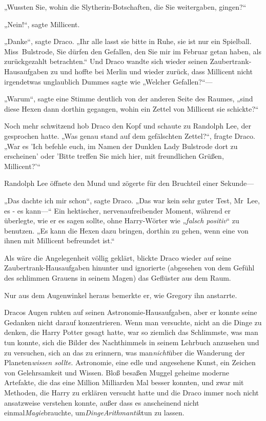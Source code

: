 {„Wussten Sie, wohin die Slytherin-Botschaften, die Sie weitergaben, gingen?“

„Nein!“, sagte Millicent.

„Danke“, sagte Draco. „Ihr alle lasst sie bitte in Ruhe, sie ist nur ein Spielball. Miss~Bulstrode, Sie dürfen den Gefallen, den Sie mir im Februar getan haben, als zurückgezahlt betrachten.“ Und Draco wandte sich wieder seinen Zaubertrank-Hausaufgaben zu und hoffte bei Merlin und wieder zurück, dass Millicent nicht irgendetwas unglaublich Dummes sagte wie „Welcher Gefallen?“—

„Warum“, sagte eine Stimme deutlich von der anderen Seite des Raumes, „sind diese Hexen dann dorthin gegangen, wohin ein Zettel von Millicent sie schickte?“

Noch mehr schwitzend hob Draco den Kopf und schaute zu Randolph Lee, der gesprochen hatte. „Was genau stand auf dem gefälschten Zettel?“, fragte Draco. „War es 'Ich befehle euch, im Namen der Dunklen Lady Bulstrode dort zu erscheinen' oder 'Bitte treffen Sie mich hier, mit freundlichen Grüßen, Millicent?'“

Randolph Lee öffnete den Mund und zögerte für den Bruchteil einer Sekunde—

„Das dachte ich mir schon“, sagte Draco. „Das war kein sehr guter Test, Mr~Lee, es - es kann—“ Ein hektischer, nervenaufreibender Moment, während er überlegte, wie er es sagen sollte, ohne Harry-Wörter wie „\emph{falsch positiv}“ zu benutzen. „Es kann die Hexen dazu bringen, dorthin zu gehen, wenn eine von ihnen mit Millicent befreundet ist.“

Als wäre die Angelegenheit völlig geklärt, blickte Draco wieder auf seine Zaubertrank-Hausaufgaben hinunter und ignorierte (abgesehen von dem Gefühl des schlimmen Grauens in seinem Magen) das Geflüster aus dem Raum.

Nur aus dem Augenwinkel heraus bemerkte er, wie Gregory ihn anstarrte.

Dracos Augen ruhten auf seinen Astronomie-Hausaufgaben, aber er konnte seine Gedanken nicht darauf konzentrieren. Wenn man versuchte, nicht an die Dinge zu denken, die Harry Potter gesagt hatte, war so ziemlich das Schlimmste, was man tun konnte, sich die Bilder des Nachthimmels in seinem Lehrbuch anzusehen und zu versuchen, sich an das zu erinnern, was man\emph{nicht}über die Wanderung der Planeten\emph{wissen sollte}. Astronomie, eine edle und angesehene Kunst, ein Zeichen von Gelehrsamkeit und Wissen. Bloß besaßen Muggel geheime moderne Artefakte, die das eine Million Milliarden Mal besser konnten, und zwar mit Methoden, die Harry zu erklären versucht hatte und die Draco immer noch nicht ansatzweise verstehen konnte, außer dass es anscheinend nicht einmal\emph{Magie}brauchte, um\emph{DingeArithmantik}tun zu lassen.

}
